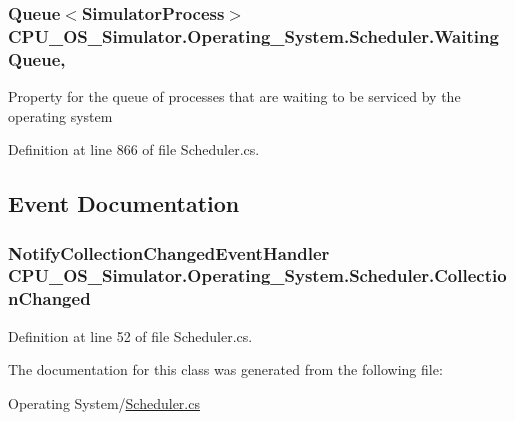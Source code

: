 \subsubsection[{Waiting\+Queue}]{\setlength{\rightskip}{0pt plus 5cm}Queue$<${\bf Simulator\+Process}$>$ C\+P\+U\+\_\+\+O\+S\+\_\+\+Simulator.\+Operating\+\_\+\+System.\+Scheduler.\+Waiting\+Queue\hspace{0.3cm}{\ttfamily [get]}, {\ttfamily [set]}}\label{class_c_p_u___o_s___simulator_1_1_operating___system_1_1_scheduler_aac41827d1eff5710d0a9b5ea664dd99f}


Property for the queue of processes that are waiting to be serviced by the operating system 



Definition at line 866 of file Scheduler.\+cs.



\subsection{Event Documentation}
\hypertarget{class_c_p_u___o_s___simulator_1_1_operating___system_1_1_scheduler_a13cc271f1cf9b76d1cbc87988c45e1fb}{}
\subsubsection[{Collection\+Changed}]{\setlength{\rightskip}{0pt plus 5cm}Notify\+Collection\+Changed\+Event\+Handler C\+P\+U\+\_\+\+O\+S\+\_\+\+Simulator.\+Operating\+\_\+\+System.\+Scheduler.\+Collection\+Changed}\label{class_c_p_u___o_s___simulator_1_1_operating___system_1_1_scheduler_a13cc271f1cf9b76d1cbc87988c45e1fb}


Definition at line 52 of file Scheduler.\+cs.



The documentation for this class was generated from the following file\+:\begin{DoxyCompactItemize}
\item 
Operating System/\hyperlink{_scheduler_8cs}{Scheduler.\+cs}\end{DoxyCompactItemize}
